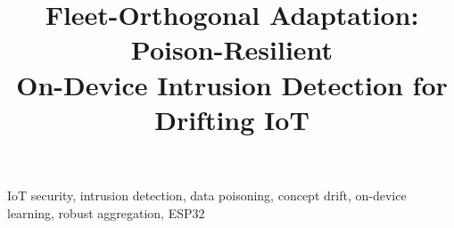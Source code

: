 \documentclass[conference]{IEEEtran}
\theoremstyle{definition}
\begin{document}
\title{Fleet-Orthogonal Adaptation: Poison-Resilient\\On-Device Intrusion Detection for Drifting IoT}

\author{
}

\maketitle

\begin{abstract}

\end{abstract}

\begin{IEEEkeywords}
IoT security, intrusion detection, data poisoning, concept drift, on-device learning, robust aggregation, ESP32
\end{IEEEkeywords}





\end{document}
